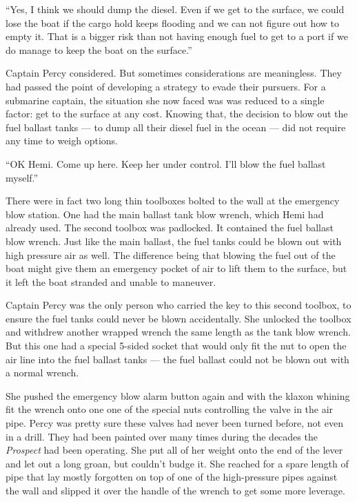 \documentclass[]{article}
\begin{document}
\begin{multicols}{2}
``Yes, I think we should dump the diesel. Even if we get to the surface,
we could lose the boat if the cargo hold keeps flooding and we can not
figure out how to empty it. That is a bigger risk than not having enough
fuel to get to a port if we do manage to keep the boat on the surface.''

Captain Percy considered. But sometimes considerations are meaningless.
They had passed the point of developing a strategy to evade their
pursuers. For a submarine captain, the situation she now faced was was
reduced to a single factor: get to the surface at any cost. Knowing
that, the decision to blow out the fuel ballast tanks --- to dump all
their diesel fuel in the ocean --- did not require any time to weigh
options.

``OK Hemi. Come up here. Keep her under control. I'll blow the fuel
ballast myself.''

There were in fact two long thin toolboxes bolted to the wall at the
emergency blow station. One had the main ballast tank blow wrench, which
Hemi had already used. The second toolbox was padlocked. It contained
the fuel ballast blow wrench. Just like the main ballast, the fuel tanks
could be blown out with high pressure air as well. The difference being
that blowing the fuel out of the boat might give them an emergency
pocket of air to lift them to the surface, but it left the boat stranded
and unable to maneuver.

Captain Percy was the only person who carried the key to this second
toolbox, to ensure the fuel tanks could never be blown accidentally. She
unlocked the toolbox and withdrew another wrapped wrench the same length
as the tank blow wrench. But this one had a special 5-sided socket that
would only fit the nut to open the air line into the fuel ballast tanks
--- the fuel ballast could not be blown out with a normal wrench.

She pushed the emergency blow alarm button again and with the klaxon
whining fit the wrench onto one one of the special nuts controlling the
valve in the air pipe. Percy was pretty sure these valves had never been
turned before, not even in a drill. They had been painted over many
times during the decades the \emph{Prospect} had been operating. She put
all of her weight onto the end of the lever and let out a long groan,
but couldn't budge it. She reached for a spare length of pipe that lay
mostly forgotten on top of one of the high-pressure pipes against the
wall and slipped it over the handle of the wrench to get some more
leverage.


\end{multicols}
\end{document}
